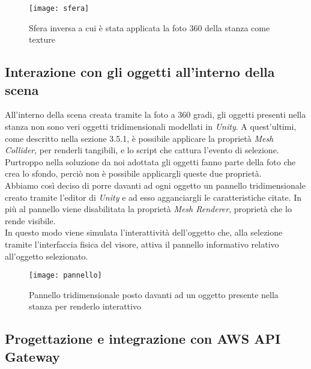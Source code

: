 \label{Sfera}
\begin{figure}[ht]
	\begin{center}
		\texttt{[image: sfera]}
		\caption{Sfera inversa a cui è stata applicata la foto 360 della stanza come texture}
	\end{center}
\end{figure}
\FloatBarrier  

\hypertarget{3.2.4}{\subsection{Interazione con gli oggetti all'interno della scena}} 

All'interno della scena creata tramite la foto a 360 gradi, gli oggetti presenti nella stanza non sono veri oggetti tridimensionali modellati in \textit{Unity}. A quest'ultimi, come descritto nella sezione 3.5.1, è possibile applicare la proprietà \textit{Mesh Collider}, per renderli tangibili, e lo script che cattura l'evento di selezione. Purtroppo nella soluzione da noi adottata gli oggetti fanno parte della foto che crea lo sfondo, perciò non è possibile applicargli queste due proprietà. \\
Abbiamo così deciso di porre davanti ad ogni oggetto un pannello tridimensionale creato tramite l'editor di \textit{Unity} e ad esso agganciargli le caratteristiche citate. In più al pannello viene disabilitata la proprietà \textit{Mesh Renderer}, proprietà che lo rende visibile. \\ 
In questo modo viene simulata l'interattività dell'oggetto che, alla selezione tramite l'interfaccia fisica del visore, attiva il pannello informativo relativo all'oggetto selezionato.

\label{Oggetto Interattivo}
\begin{figure}[ht]
	\begin{center}
		\texttt{[image: pannello]}
		\caption{Pannello tridimensionale posto davanti ad un oggetto presente nella stanza per renderlo interattivo}
	\end{center}
\end{figure}
\FloatBarrier  

\subsection{Progettazione e integrazione con AWS API Gateway}

